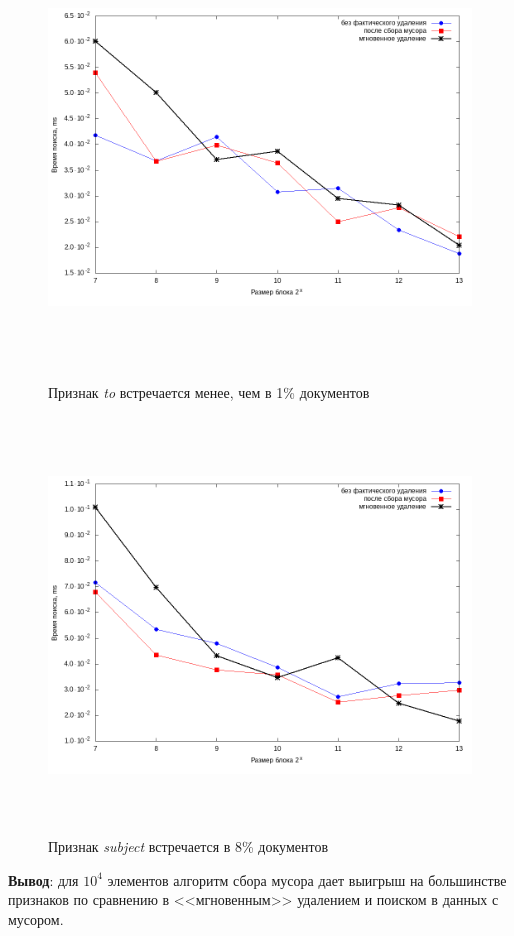 \begin{figure}[H]
\includegraphics[width=\linewidth, height=11cm]{fig/limit_1/1e4/to.png}
\caption{Признак \textit{to} встречается менее, чем в 1\% документов}
\includegraphics[width=\linewidth, height=11cm]{fig/limit_1/1e4/subject.png}
\caption{Признак \textit{subject} встречается в 8\% документов}
\end{figure}

\textbf{Вывод}: для $10^4$ элементов алгоритм сбора мусора дает выигрыш на большинстве признаков
по сравнению в <<мгновенным>> удалением и поиском в данных с мусором.

